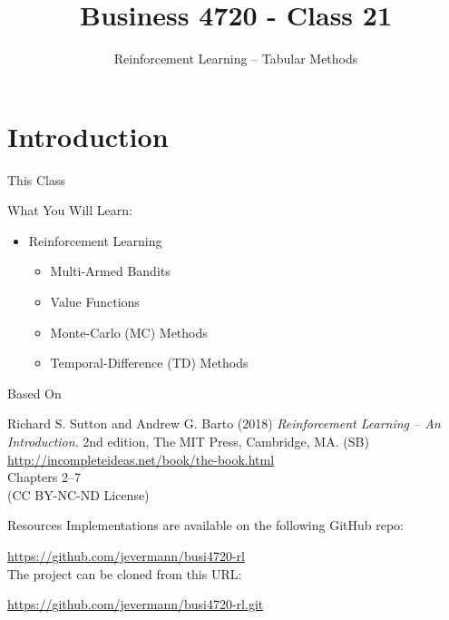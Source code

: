 \documentclass[ignorenonframetext,xcolor=x11names]{beamer}
\title{Business 4720 - Class 21}
\subtitle{Reinforcement Learning -- Tabular Methods}
\begin{document}
\begin{frame}[label=full]{}
  \titlepage
  \footnotesize
  
\end{frame}

\section{Introduction}

\begin{frame}[label=full]{This Class}

\begin{block}{What You Will Learn:}
\begin{itemize}
  \item Reinforcement Learning
  \begin{itemize}
     \item Multi-Armed Bandits
     \item Value Functions
     \item Monte-Carlo (MC) Methods
     \item Temporal-Difference (TD) Methods
  \end{itemize}
\end{itemize}
\end{block}
\end{frame}

\begin{frame}[label=full]{Based On}
\begin{block}{}
Richard S. Sutton and Andrew G. Barto (2018) \emph{Reinforcement Learning -- An Introduction}. 2nd edition, The MIT Press, Cambridge, MA. (SB) \\
\vspace{0.5\baselineskip}
\url{http://incompleteideas.net/book/the-book.html} \\
\vspace{0.5\baselineskip}
Chapters 2--7 \\
\vspace{0.5\baselineskip}
(CC BY-NC-ND License)
\end{block}
\end{frame}

\begin{frame}[label=withcode]{Resources}
Implementations are available on the following GitHub repo:

\url{https://github.com/jevermann/busi4720-rl} \\


The project can be cloned from this URL:

\url{https://github.com/jevermann/busi4720-rl.git}
\end{frame}
\end{document}
